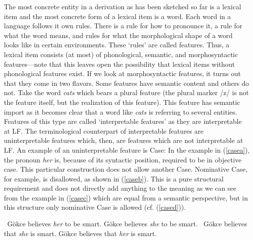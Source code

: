 The most concrete entity in a derivation as has been sketched so far is a lexical item and the most concrete form of a lexical item is a word. Each word in a language follows it own rules. There is a rule for how to pronounce it, a rule for what the word means, and rules for what the morphological shape of a word looks like in certain environments. These `rules' are called features. Thus, a lexical item consists (at most) of phonological, semantic, and morphosyntactic features---note that this leaves open the possibility that lexical items without phonological features exist. If we look at morphosyntactic features, it turns out that they come in two flavors. Some features have semantic content and others do not. Take the word \textit{cats} which bears a plural feature (the plural marker /z/ is not the feature itself, but the realization of this feature). This feature has semantic import as it becomes clear that a word like \textit{cats} is referring to several entities. Features of this type are called `interpretable features' as they are interpretable at LF. The terminological counterpart of interpretable features are uninterpretable features which, then, are features which are not interpretable at LF. An example of an uninterpretable feature is Case: In the example in (\ref{casea}), the pronoun \textit{her} is, because of its syntactic position, required to be in objective case. This particular construction does not allow another Case. Nominative Case, for example, is disallowed, as shown in (\ref{caseb}). This is a pure structural requirement and does not directly add anything to the meaning as we can see from the example in (\ref{casec}) which are equal from a semantic perspective, but in this structure only nominative Case is allowed (cf. (\ref{cased})). 

\begin{exe}
\ex\label{case}\begin{xlist}
\ex \textcolor{white}{*}Gökce believes \textit{her} to be smart. \label{casea}
\ex *Gökce believes \textit{she} to be smart. \label{caseb}
\ex \textcolor{white}{*}Gökce believes that \textit{she} is smart. \label{casec}
\ex *Gökce believes that \textit{her} is smart. \label{cased}
\end{xlist}
\end{exe}








